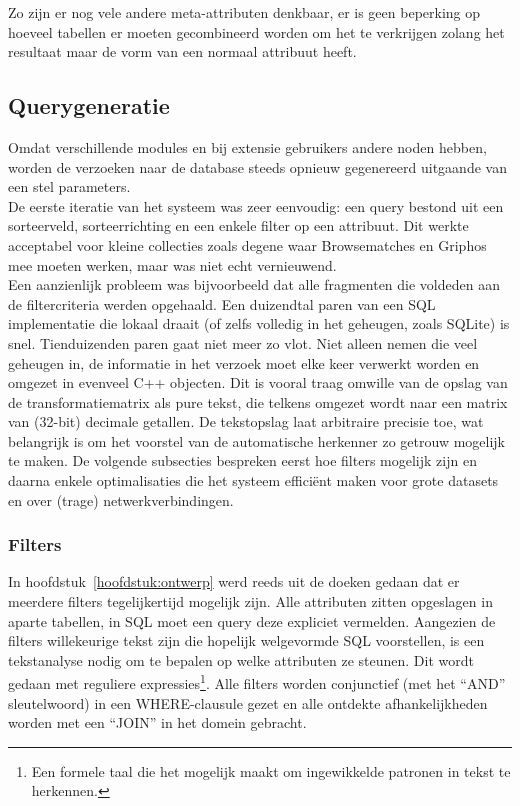 

Zo zijn er nog vele andere meta-attributen denkbaar, er is geen beperking op hoeveel tabellen er moeten gecombineerd worden om het te verkrijgen zolang het resultaat maar de vorm van een normaal attribuut heeft.

\subsection{Querygeneratie}
Omdat verschillende modules en bij extensie gebruikers andere noden hebben, worden de verzoeken naar de database steeds opnieuw gegenereerd uitgaande van een stel parameters.\\

De eerste iteratie van het systeem was zeer eenvoudig: een query bestond uit een sorteerveld, sorteerrichting en een enkele filter op een attribuut. Dit werkte acceptabel voor kleine collecties zoals degene waar Browsematches en Griphos mee moeten werken, maar was niet echt vernieuwend.\\

Een aanzienlijk probleem was bijvoorbeeld dat alle fragmenten die voldeden aan de filtercriteria werden opgehaald. Een duizendtal paren van een SQL implementatie die lokaal draait (of zelfs volledig in het geheugen, zoals SQLite) is snel. Tienduizenden paren gaat niet meer zo vlot. Niet alleen nemen die veel geheugen in, de informatie in het verzoek moet elke keer verwerkt worden en omgezet in evenveel C++ objecten. Dit is vooral traag omwille van de opslag van de transformatiematrix als pure tekst, die telkens omgezet wordt naar een matrix van (32-bit) decimale getallen. De tekstopslag laat arbitraire precisie toe, wat belangrijk is om het voorstel van de automatische herkenner zo getrouw mogelijk te maken. De volgende subsecties bespreken eerst hoe filters mogelijk zijn en daarna enkele optimalisaties die het systeem effici\"ent maken voor grote datasets en over (trage) netwerkverbindingen.

\subsubsection{Filters}
In hoofdstuk~\ref{hoofdstuk:ontwerp} werd reeds uit de doeken gedaan dat er meerdere filters tegelijkertijd mogelijk zijn. Alle attributen zitten opgeslagen in aparte tabellen, in SQL moet een query deze expliciet vermelden. Aangezien de filters willekeurige tekst zijn die hopelijk welgevormde SQL voorstellen, is een tekstanalyse nodig om te bepalen op welke attributen ze steunen. Dit wordt gedaan met reguliere expressies\footnote{Een formele taal die het mogelijk maakt om ingewikkelde patronen in tekst te herkennen.}. Alle filters worden conjunctief (met het ``AND'' sleutelwoord) in een WHERE-clausule gezet en alle ontdekte afhankelijkheden worden met een ``JOIN'' in het domein gebracht.\\

